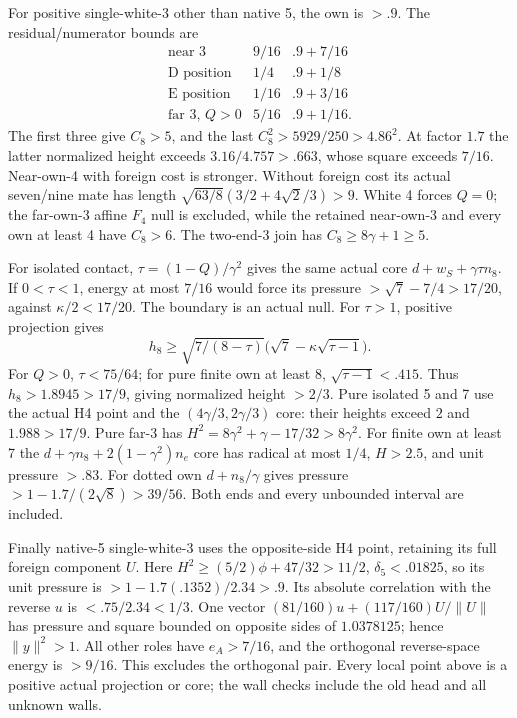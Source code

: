 \documentclass[11pt]{article}
\theoremstyle{definition}
\theoremstyle{remark}
\newcommand{\norm}[1]{\lVert #1\rVert}
\begin{document}
For positive single-white-3 other than native 5, the own is \(>.9\).
The residual/numerator bounds are
\[
 \begin{array}{c|c|c}
 \text{near 3}&9/16&.9+7/16\\
 \text{D position}&1/4&.9+1/8\\
 \text{E position}&1/16&.9+3/16\\
 \text{far 3, }Q>0&5/16&.9+1/16 .
 \end{array}
\]
The first three give \(C_8>5\), and the last
\(C_8^2>5929/250>4.86^2\).
At factor \(1.7\) the latter normalized height exceeds
\(3.16/4.757>.663\), whose square exceeds \(7/16\).
Near-own-4 with foreign cost is stronger.
Without foreign cost its actual seven/nine mate has length
\(\sqrt{63/8}(3/2+4\sqrt2/3)>9\).
White 4 forces \(Q=0\); the far-own-3 affine \(F_4\) null is
excluded, while the retained near-own-3 and every own at least 4
have \(C_8>6\).
The two-end-3 join has \(C_8\ge8\gamma+1\ge5\).

For isolated contact, \(\tau=(1-Q)/\gamma^2\) gives the same
actual core \(d+w_S+\gamma\tau n_8\).
If \(0<\tau<1\), energy at most \(7/16\) would force its
pressure \(>\sqrt7-7/4>17/20\), against
\(\kappa/2<17/20\).  The boundary is an actual null.
For \(\tau>1\), positive projection gives
\[
 h_8\ge\sqrt{7/(8-\tau)}
               \bigl(\sqrt7-\kappa\sqrt{\tau-1}\bigr).
\]
For \(Q>0\), \(\tau<75/64\); for pure finite own at least 8,
\(\sqrt{\tau-1}<.415\).
Thus \(h_8>1.8945>17/9\), giving normalized height \(>2/3\).
Pure isolated 5 and 7 use the actual H4 point and the
\((4\gamma/3,2\gamma/3)\) core: their heights exceed
\(2\) and \(1.988>17/9\).
Pure far-3 has \(H^2=8\gamma^2+\gamma-17/32>8\gamma^2\).
For finite own at least 7 the
\(d+\gamma n_8+2(1-\gamma^2)n_e\) core has radical
at most \(1/4\), \(H>2.5\), and unit pressure \(>.83\).
For dotted own \(d+n_8/\gamma\) gives pressure
\(>1-1.7/(2\sqrt8)>39/56\).
Both ends and every unbounded interval are included.

Finally native-5 single-white-3 uses the opposite-side H4 point,
retaining its full foreign component \(U\).
Here \(H^2\ge(5/2)\phi+47/32>11/2\),
\(\delta_5<.01825\), so its unit pressure is
\(>1-1.7(.1352)/2.34>.9\).
Its absolute correlation with the reverse \(u\) is
\(<.75/2.34<1/3\).
One vector
\((81/160)u+(117/160)U/\norm U\)
has pressure and square bounded on opposite sides of \(1.0378125\);
hence \(\norm y^2>1\).
All other roles have \(e_A>7/16\), and the orthogonal
reverse-space energy is \(>9/16\).
This excludes the orthogonal pair.  Every local point above is
a positive actual projection or core; the wall checks include
the old head and all unknown walls.
\end{document}
